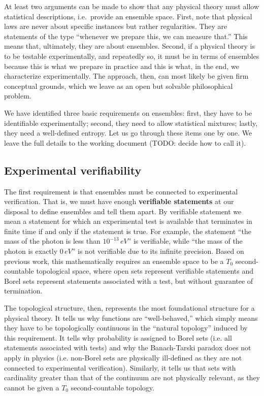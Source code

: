 \documentclass[10pt,twocolumn, nofootinbib]{revtex4-2}
\begin{document}
At least two arguments can be made to show that any physical theory must allow statistical descriptions, i.e.~provide an ensemble space. First, note that physical laws are never about specific instances but rather regularities. They are statements of the type ``whenever we prepare this, we can measure that.'' This means that, ultimately, they are about ensembles. Second, if a physical theory is to be testable experimentally, and repeatedly so, it must be in terms of ensembles because this is what we prepare in practice and this is what, in the end, we characterize experimentally. The approach, then, can most likely be given firm conceptual grounds, which we leave as an open but solvable philosophical problem.

We have identified three basic requirements on ensembles: first, they have to be identifiable experimentally; second, they need to allow statistical mixtures; lastly, they need a well-defined entropy. Let us go through these items one by one. We leave the full details to the working document (TODO: decide how to call it).

\subsection{Experimental verifiability}
The first requirement is that ensembles must be connected to experimental verification. That is, we must have enough \textbf{verifiable statements} at our disposal to define ensembles and tell them apart. By verifiable statement we mean a statement for which an experimental test is available that terminates in finite time if and only if the statement is true. For example, the statement ``the mass of the photon is less than $10^{-13} \, eV$'' is verifiable, while ``the mass of the photon is exactly $0 \, eV$'' is not verifiable due to its infinite precision. Based on previous work, this mathematically requires an ensemble space to be a $T_0$ second-countable topological space, where open sets represent verifiable statements and Borel sets represent statements associated with a test, but without guarantee of termination.

The topological structure, then, represents the most foundational structure for a physical theory. It tells us why functions are ``well-behaved,'' which simply means they have to be topologically continuous in the ``natural topology'' induced by this requirement. It tells why probability is assigned to Borel sets (i.e. all statements associated with tests) and why the Banach-Tarski paradox does not apply in physics (i.e. non-Borel sets are physically ill-defined as they are not connected to experimental verification). Similarly, it tells us that sets with cardinality greater than that of the continuum are not physically relevant, as they cannot be given a $T_0$ second-countable topology.
\end{document}
